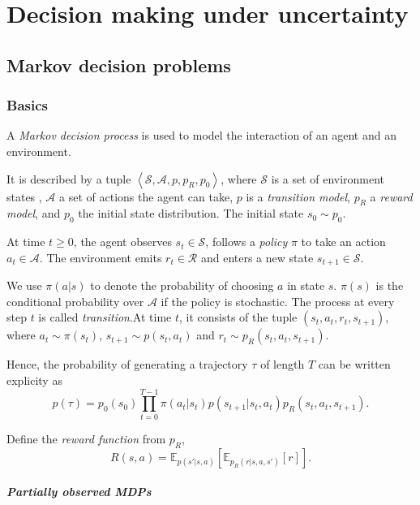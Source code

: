 \documentclass[../main.tex]{subfiles}
\begin{document}
\chapter{Decision making under uncertainty}

\section{Markov decision problems}

\subsection{Basics}


A \emph{Markov decision process} is used to model the interaction of an agent and an environment.

It is described by a tuple $\left\langle \mathcal{S}, \mathcal{A}, p, p_{R}, p_{0} \right\rangle $, where $\mathcal{S}$ is a set of environment states
, $\mathcal{A}$ a set of actions the agent can take, $p$ is a \emph{transition model}, $p_{R}$ a \emph{reward model}, and $p_{0}$ the initial state distribution. The initial state $s_0 \sim  p_0$.

At time $t \ge  0$, the agent observes $s_{t} \in  \mathcal{S}$, follows a \emph{policy} $\pi$ to take an action $a_{t} \in \mathcal{A}$. The environment emits $r_{t} \in  \mathcal{R}$ and 
enters a new state $s_{t+1} \in  \mathcal{S}$.

We use $\pi(a|s)$ to denote the probability of choosing $a$ in state $s$. $\pi(s)$ is the conditional probability over $\mathcal{A}$ if the policy is stochastic.
The process at every step $t$ is called \emph{transition}.At time $t$, it consists of the tuple $(s_{t}, a_{t}, r_{t}, s_{t+1})$, where $a_{t} \sim  \pi(s_{t})$, $s_{t+1} \sim  p(s_{t}, a_{t})$ and $r_{t}\sim  p_{R}(s_{t}, a_{t}, s_{t+1})$.

Hence, the probability  of generating a trajectory $\tau$ of length $T$ can be written explicity as 
\[
p(\tau) = p_0(s_0) \prod_{t=0}^{T-1} \pi(a_{t}|s_{t}) p(s_{t+1} | s_t,a_{t}) p_{R}(s_{t}, a_{t}, s_{t+1}).
\]

Define the \emph{reward function} from $p_{R}$, 
\[
R(s,a) =  \mathbb{E}_{p(s'|s,a)} \left[ \mathbb{E} _{p_{R}(r|s,a,s')}[r] \right] .
\]

\paragraph{Partially observed MDPs}
\end{document}
